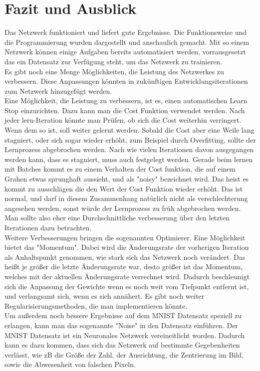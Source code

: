 \documentclass[12pt]{article}
\begin{document}
\section{Fazit und Ausblick}
Das Netzwerk funktioniert und liefert gute Ergebnisse. Die Funktionsweise und die Programmierung wurden dargestellt und anschaulich gemacht.
Mit so einem Netzwerk können einige Aufgaben bereits automatisiert werden, vorrausgesetzt das ein Datensatz zur Verfügung steht, um das Netzwerk zu trainieren.\\
Es gibt noch eine Menge Möglichkeiten, die Leistung des Netzwerkes zu verbessern. Diese Anpassungen könnten in zukünftigen Entwicklungsiterationen zum Netzwerk hinzugefügt werden.\\
Eine Möglichkeit, die Leistung zu verbessern, ist es, einen automatischen Learn Stop einzurichten. Dazu kann man die Cost Funktion verwendet werden. Nach jeder lern-Iteration könnte man Prüfen, ob sich die Cost weiterhin verringert. Wenn dem so ist, soll weiter gelernt werden. Sobald die Cost aber eine Weile lang stagniert, oder sich sogar wieder erhöht, zum Beispiel durch Overfitting, sollte der Lernprozess abgebrochen werden. Nach wie vielen Iterationen davon ausgegangen werden kann, dass es stagniert, muss auch festgelegt werden. Gerade beim lernen mit Batches kommt es zu einem Verhalten der Cost funktion, die auf einem Grahen etwas sprunghaft aussieht, und als "noisy" bezeichnet wird. Das heist es kommt zu ausschlägen die den Wert der Cost Funktion wieder erhöht. Das ist normal, und darf in diesem Zusammenhang natürlich nicht als verschlechterung angesehen werden, sonst würde der Lernprozess zu früh abgebrochen werden. Man sollte also eher eine Durchschnittliche verbesserung über den letzten Iterationen dazu betrachten.\\
Weitere Verbesserungen bringen die sogenannten Optimierer. Eine Möglichkeit bietet das "Momentum". Dabei wird die Änderungsrate der vorherigen Iteration als Anhaltspunkt genommen, wie stark sich das Netzwerk noch verändert. Das heißt je größer die letzte Änderungsrate war, desto größer ist das Momentum, welches mit der aktuellen Änderungsrate verrechnet wird. Dadurch beschleunigt sich die Anpassung der Gewichte wenn es noch weit vom Tiefpunkt entfernt ist, und verlangsamt sich, wenn es sich annähert. Es gibt noch weiter Regularisierungsmethoden, die man implementieren könnte.\\
Um außerdem noch bessere Ergebnisse auf dem MNIST Datensatz speziell zu erlangen, kann man das sogenannte "Noise" in den Datensatz einführen. Der MNIST Datensatz ist ein Neuronales Netzwerk vereineitlicht worden. Dadurch kann es dazu kommen, dass sich das Netzwerk auf bestimmte Gegebenheiten verlässt, wie zB die Größe der Zahl, der Ausrichtung, die Zentrierung im Bild, sowie die Abwesenheit von falschen Pixeln.\\
\end{document}
